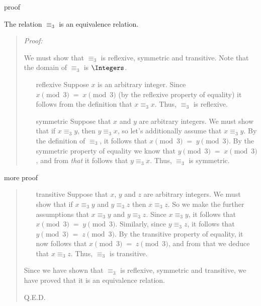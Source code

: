 \documentclass[handout,landscape]{beamer}
\begin{document}
\begin{frame}{proof}
\begin{thm*}
The relation $\equiv_3$ is an equivalence relation.
\end{thm*} \pause

\begin{quote} \emph{Proof:}

We must show that $\equiv_3$ is reflexive, symmetric and transitive. Note that the domain of $\equiv_3$ is $\Integers$.
\pause

\begin{itemize}
\item[reflexive] Suppose $x$ is an arbitrary integer.  Since $x \pmod{3} \; = \; x \pmod{3}$ (by the reflexive property of equality) it follows from the definition that $x \equiv_3 x$.  Thus, $\equiv_3$ is reflexive. \pause
\item[symmetric] Suppose that $x$ and $y$ are arbitrary integers.  We must show that if $x \equiv_3 y$, then $y \equiv_3 x$, so let's additionally assume that $x \equiv_3 y$.  By the definition of $\equiv_3$, it follows that $x \pmod{3} \; = \; y \pmod{3}$.  By the symmetric property of equality we know that $y \pmod{3} \; = \; x \pmod{3}$, and from {\em that} it follows that $y \equiv_3 x$.  Thus, $\equiv_3$ is symmetric.
\end{itemize}
\end{quote}
\end{frame}

\begin{frame}{more proof}

\begin{quote}
\begin{itemize}
\item[transitive] Suppose that $x$, $y$ and $z$ are arbitrary integers.  We must show that if $x \equiv_3 y$ and $y \equiv_3 z$ then $x \equiv_3 z$. So we make the further assumptions that $x \equiv_3 y$ and $y \equiv_3 z$.  Since $x \equiv_3 y$, it follows that $x \pmod{3} \; = \; y \pmod{3}$.  Similarly, since $y \equiv_3 z$, it follows that $y \pmod{3} \; = \; z \pmod{3}$.  By the transitive property of equality, it now follows that $x \pmod{3} \; = \; z \pmod{3}$, and from that we deduce that $x \equiv_3 z$. Thus, $\equiv_3$ is transitive. \pause
\end{itemize}

Since we have shown that $\equiv_3$ is reflexive, symmetric and transitive, we have proved that it is an equivalence relation.

\rule{0pt}{0pt} \newline \rule{0pt}{15pt} \hfill Q.E.D. 

\end{quote}
\end{frame}
\end{document}
